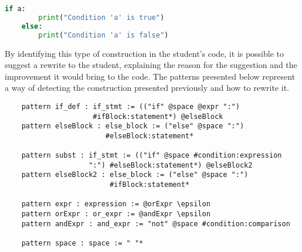 \begin{lstlisting}[language=Python]
    if a:
        print("Condition 'a' is true")
    else:
        print("Condition 'a' is false")
\end{lstlisting}

By identifying this type of construction in the student's code, it is possible
to suggest a rewrite to the student, explaining the reason for the suggestion
and the improvement it would bring to the code. The patterns presented below
represent a way of detecting the construction presented previously and how to
rewrite it.




\begin{verbatim}
    pattern if_def : if_stmt := (("if" @space @expr ":")
                     #ifBlock:statement*) @elseBlock
    pattern elseBlock : else_block := ("else" @space ":")
                        #elseBlock:statement*

    pattern subst : if_stmt := (("if" @space #condition:expression
                    ":") #elseBlock:statement*) @elseBlock2
    pattern elseBlock2 : else_block := ("else" @space ":")
                         #ifBlock:statement*

    pattern expr : expression := @orExpr \epsilon
    pattern orExpr : or_expr := @andExpr \epsilon
    pattern andExpr : and_expr := "not" @space #condition:comparison

    pattern space : space := " "*
\end{verbatim}


